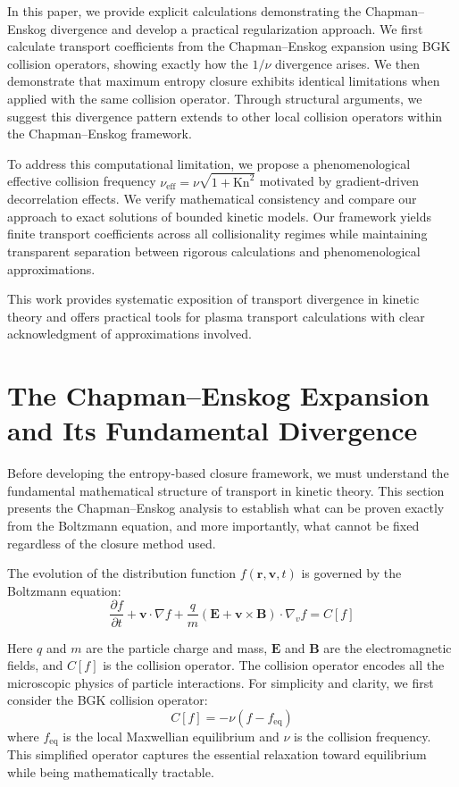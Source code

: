 \documentclass[12pt,a4paper]{article}
\newcommand{\vect}[1]{\mathbf{#1}}
\newcommand{\Kn}{\text{Kn}}
\newcommand{\eff}{\text{eff}}
\begin{document}
In this paper, we provide explicit calculations demonstrating the Chapman--Enskog divergence and develop a practical regularization approach. We first calculate transport coefficients from the Chapman--Enskog expansion using BGK collision operators, showing exactly how the $1/\nu$ divergence arises. We then demonstrate that maximum entropy closure exhibits identical limitations when applied with the same collision operator. Through structural arguments, we suggest this divergence pattern extends to other local collision operators within the Chapman--Enskog framework.

To address this computational limitation, we propose a phenomenological effective collision frequency $\nu_{\eff} = \nu\sqrt{1 + \Kn^2}$ motivated by gradient-driven decorrelation effects. We verify mathematical consistency and compare our approach to exact solutions of bounded kinetic models. Our framework yields finite transport coefficients across all collisionality regimes while maintaining transparent separation between rigorous calculations and phenomenological approximations.

This work provides systematic exposition of transport divergence in kinetic theory and offers practical tools for plasma transport calculations with clear acknowledgment of approximations involved.

\section{The Chapman--Enskog Expansion and Its Fundamental Divergence}

Before developing the entropy-based closure framework, we must understand the fundamental mathematical structure of transport in kinetic theory. This section presents the Chapman--Enskog analysis to establish what can be proven exactly from the Boltzmann equation, and more importantly, what cannot be fixed regardless of the closure method used.

The evolution of the distribution function $f(\vect{r}, \vect{v}, t)$ is governed by the Boltzmann equation:
\begin{equation}
\frac{\partial f}{\partial t} + \vect{v} \cdot \nabla f + \frac{q}{m}(\vect{E} + \vect{v} \times \vect{B}) \cdot \nabla_v f = C[f]
\label{eq:boltzmann}
\end{equation}

Here $q$ and $m$ are the particle charge and mass, $\vect{E}$ and $\vect{B}$ are the electromagnetic fields, and $C[f]$ is the collision operator. The collision operator encodes all the microscopic physics of particle interactions. For simplicity and clarity, we first consider the BGK collision operator:
\begin{equation}
C[f] = -\nu(f - f_{\text{eq}})
\label{eq:bgk}
\end{equation}
where $f_{\text{eq}}$ is the local Maxwellian equilibrium and $\nu$ is the collision frequency. This simplified operator captures the essential relaxation toward equilibrium while being mathematically tractable.
\end{document}
